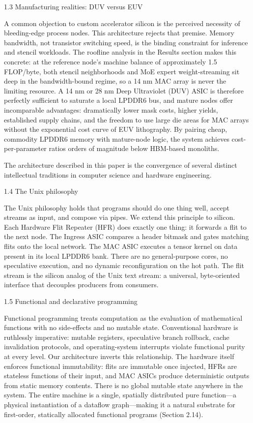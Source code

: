 \documentclass[10pt,twocolumn]{article}
\begin{document}
1.3 Manufacturing realities: DUV versus EUV

A common objection to custom accelerator silicon is the perceived necessity of bleeding-edge process nodes. This architecture rejects that premise. Memory bandwidth, not transistor switching speed, is the binding constraint for inference and stencil workloads. The roofline analysis in the Results section makes this concrete: at the reference node's machine balance of approximately 1.5 FLOP/byte, both stencil neighborhoods and MoE expert weight-streaming sit deep in the bandwidth-bound regime\cite{5}, so a 14 nm MAC array is never the limiting resource. A 14 nm or 28 nm Deep Ultraviolet (DUV) ASIC is therefore perfectly sufficient to saturate a local LPDDR6 bus\cite{17}, and mature nodes offer incomparable advantages: dramatically lower mask costs, higher yields, established supply chains, and the freedom to use large die areas for MAC arrays without the exponential cost curve of EUV lithography. By pairing cheap, commodity LPDDR6 memory with mature-node logic, the system achieves cost-per-parameter ratios orders of magnitude below HBM-based monoliths.

The architecture described in this paper is the convergence of several distinct intellectual traditions in computer science and hardware engineering.

1.4 The Unix philosophy

The Unix philosophy holds that programs should do one thing well, accept streams as input, and compose via pipes\cite{7}. We extend this principle to silicon. Each Hardware Flit Repeater (HFR) does exactly one thing: it forwards a flit to the next node. The Ingress ASIC compares a header bitmask and gates matching flits onto the local network. The MAC ASIC executes a tensor kernel on data present in its local LPDDR6 bank. There are no general-purpose cores, no speculative execution, and no dynamic reconfiguration on the hot path. The flit stream is the silicon analog of the Unix text stream: a universal, byte-oriented interface that decouples producers from consumers.

1.5 Functional and declarative programming

Functional programming treats computation as the evaluation of mathematical functions with no side-effects and no mutable state\cite{6}. Conventional hardware is ruthlessly imperative: mutable registers, speculative branch rollback, cache invalidation protocols, and operating-system interrupts violate functional purity at every level. Our architecture inverts this relationship. The hardware itself enforces functional immutability: flits are immutable once injected, HFRs are stateless functions of their input, and MAC ASICs produce deterministic outputs from static memory contents. There is no global mutable state anywhere in the system. The entire machine is a single, spatially distributed pure function---a physical instantiation of a dataflow graph---making it a natural substrate for first-order, statically allocated functional programs (Section 2.14).
\end{document}
